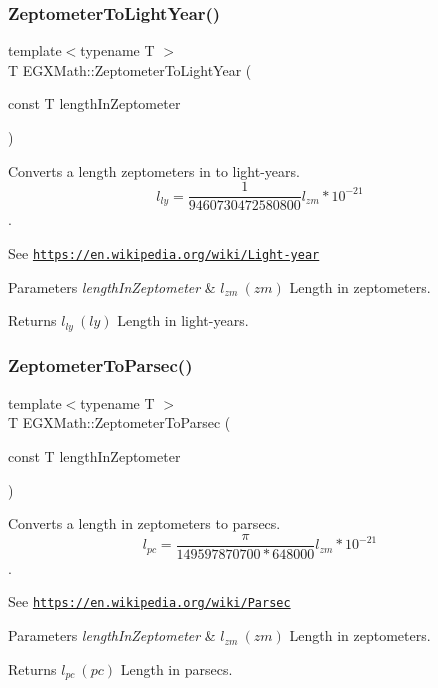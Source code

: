 \subsubsection{\texorpdfstring{Zeptometer\+To\+Light\+Year()}{ZeptometerToLightYear()}}
{\footnotesize\ttfamily template$<$typename T $>$ \\
T E\+G\+X\+Math\+::\+Zeptometer\+To\+Light\+Year (\begin{DoxyParamCaption}\item[{const T}]{length\+In\+Zeptometer }\end{DoxyParamCaption})}



Converts a length zeptometers in to light-\/years. \[ l_{ly}= \frac{1}{9460730472580800} l_{zm} * 10^{-21} \]. 

See \href{https://en.wikipedia.org/wiki/Light-year}{\tt https\+://en.\+wikipedia.\+org/wiki/\+Light-\/year} 
\begin{DoxyParams}{Parameters}
{\em length\+In\+Zeptometer} & $ l_{zm}\ (zm)$ Length in zeptometers. \\
\hline
\end{DoxyParams}
\begin{DoxyReturn}{Returns}
$ l_{ly}\ (ly)$ Length in light-\/years. 
\end{DoxyReturn}
\mbox{\label{group___e_g_x_math-_conversions-_length_conversions-_s_i-_zeptometer-_astronomical_gac8c853b247f3b577cee5510bd43fcd65}} 
\subsubsection{\texorpdfstring{Zeptometer\+To\+Parsec()}{ZeptometerToParsec()}}
{\footnotesize\ttfamily template$<$typename T $>$ \\
T E\+G\+X\+Math\+::\+Zeptometer\+To\+Parsec (\begin{DoxyParamCaption}\item[{const T}]{length\+In\+Zeptometer }\end{DoxyParamCaption})}



Converts a length in zeptometers to parsecs. \[ l_{pc}=\frac{\pi}{149597870700 * 648000} l_{zm} * 10^{-21} \]. 

See \href{https://en.wikipedia.org/wiki/Parsec}{\tt https\+://en.\+wikipedia.\+org/wiki/\+Parsec} 
\begin{DoxyParams}{Parameters}
{\em length\+In\+Zeptometer} & $ l_{zm}\ (zm)$ Length in zeptometers. \\
\hline
\end{DoxyParams}
\begin{DoxyReturn}{Returns}
$ l_{pc}\ (pc)$ Length in parsecs. 
\end{DoxyReturn}
